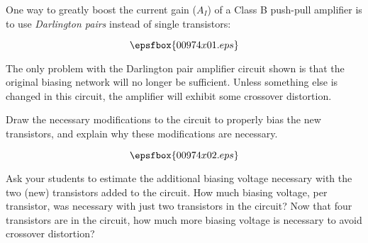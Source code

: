 

One way to greatly boost the current gain ($A_I$) of a Class B push-pull amplifier is to use {\it Darlington pairs} instead of single transistors:

$$\epsfbox{00974x01.eps}$$

The only problem with the Darlington pair amplifier circuit shown is that the original biasing network will no longer be sufficient.  Unless something else is changed in this circuit, the amplifier will exhibit some crossover distortion.

Draw the necessary modifications to the circuit to properly bias the new transistors, and explain why these modifications are necessary.







$$\epsfbox{00974x02.eps}$$







Ask your students to estimate the additional biasing voltage necessary with the two (new) transistors added to the circuit.  How much biasing voltage, per transistor, was necessary with just two transistors in the circuit?  Now that four transistors are in the circuit, how much more biasing voltage is necessary to avoid crossover distortion?





